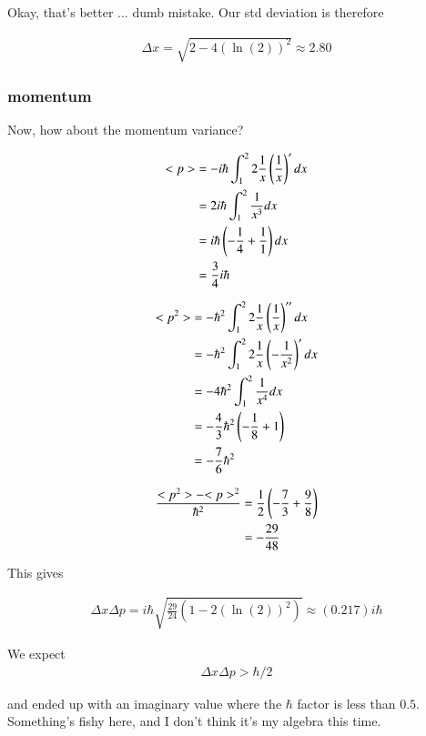 \documentclass{article}
\begin{document}
Okay, that's better ... dumb mistake. Our std deviation is therefore

\begin{align*}
\Delta x = \sqrt{2 - 4 (\ln(2))^2} \approx 2.80
\end{align*}

\subsubsection{ momentum }

Now, how about the momentum variance?

\begin{align*}
<p> 
&= -i \hbar \int_1^2 2 \frac{1}{x} \left(\frac{1}{x}\right)' dx \\
&= 2 i \hbar \int_1^2 \frac{1}{x^3} dx \\
&= i \hbar \left(-\frac{1}{4} + \frac{1}{1}\right) dx \\
&= \frac{3}{4} i \hbar
\end{align*}

\begin{align*}
<p^2> 
&= -\hbar^2 \int_1^2 2 \frac{1}{x} \left(\frac{1}{x}\right)'' dx \\
&= -\hbar^2 \int_1^2 2 \frac{1}{x} \left(-\frac{1}{x^2}\right)' dx \\
&= - 4 \hbar^2 \int_1^2 \frac{1}{x^4} dx \\
&= - \frac{4}{3} \hbar^2 \left( -\frac{1}{8} + 1 \right) \\
&= - \frac{7}{6} \hbar^2
\end{align*}

\begin{align*}
\frac{<p^2>  - {<p>}^2 }{\hbar^2}
&= \frac{1}{2}\left(-\frac{7}{3} +\frac{9}{8}\right) \\
&= -\frac{29}{48}
\end{align*}

This gives 

\begin{align*}
\Delta x \Delta p = i \hbar \sqrt{\frac{29}{24}(1 - 2 (\ln(2))^2) } \approx (0.217) i \hbar
\end{align*}

We expect 
\begin{align*}
\Delta x \Delta p > \hbar/2
\end{align*}

and ended up with an imaginary value where the $\hbar$ factor is less than $0.5$.  Something's fishy here, and I
don't think it's my algebra this time.
\end{document}
